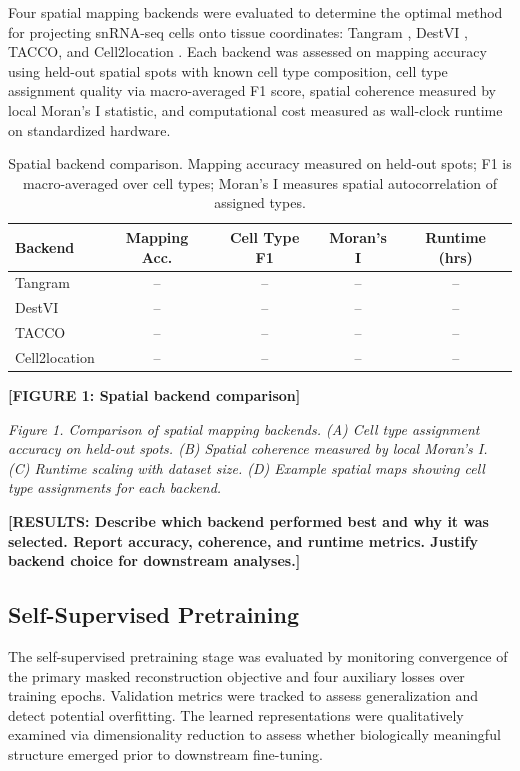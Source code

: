 Four spatial mapping backends were evaluated to determine the optimal method for projecting snRNA-seq cells onto tissue coordinates: Tangram \cite{Biancalani2021-bt}, DestVI \cite{Lopez2022-ps}, TACCO, and Cell2location \cite{Kleshchevnikov2022-cell2location}. Each backend was assessed on mapping accuracy using held-out spatial spots with known cell type composition, cell type assignment quality via macro-averaged F1 score, spatial coherence measured by local Moran's I statistic, and computational cost measured as wall-clock runtime on standardized hardware.

\begin{table}[h]
\centering
\caption{Spatial backend comparison. Mapping accuracy measured on held-out spots; F1 is macro-averaged over cell types; Moran's I measures spatial autocorrelation of assigned types.}
\label{tab:spatial_backends}
\begin{tabular}{lcccc}
\toprule
\textbf{Backend} & \textbf{Mapping Acc.} & \textbf{Cell Type F1} & \textbf{Moran's I} & \textbf{Runtime (hrs)} \\
\midrule
Tangram & -- & -- & -- & -- \\
DestVI & -- & -- & -- & -- \\
TACCO & -- & -- & -- & -- \\
Cell2location & -- & -- & -- & -- \\
\bottomrule
\end{tabular}
\end{table}

\textbf{[FIGURE 1: Spatial backend comparison]}

\textit{Figure 1. Comparison of spatial mapping backends. (A) Cell type assignment accuracy on held-out spots. (B) Spatial coherence measured by local Moran's I. (C) Runtime scaling with dataset size. (D) Example spatial maps showing cell type assignments for each backend.}

\textbf{[RESULTS: Describe which backend performed best and why it was selected. Report accuracy, coherence, and runtime metrics. Justify backend choice for downstream analyses.]}


\subsection{Self-Supervised Pretraining}

The self-supervised pretraining stage was evaluated by monitoring convergence of the primary masked reconstruction objective and four auxiliary losses over training epochs. Validation metrics were tracked to assess generalization and detect potential overfitting. The learned representations were qualitatively examined via dimensionality reduction to assess whether biologically meaningful structure emerged prior to downstream fine-tuning.

